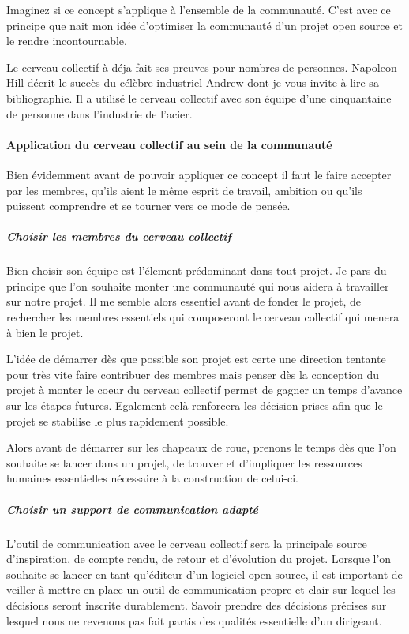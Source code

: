 			Imaginez si ce concept s'applique à l'ensemble de la communauté. C'est avec ce principe que nait mon idée d'optimiser la communauté d'un projet open source et le rendre incontournable.

			Le cerveau collectif à déja fait ses preuves pour nombres de personnes. Napoleon Hill décrit le succès du célèbre industriel Andrew  dont je vous invite à lire sa bibliographie. Il a utilisé le cerveau collectif avec son équipe d'une cinquantaine de personne dans l'industrie de l'acier.

			\paragraph{Application du cerveau collectif au sein de la communauté}

			Bien évidemment avant de pouvoir appliquer ce concept il faut le faire accepter par les membres, qu'ils aient le même esprit de travail, ambition ou qu'ils puissent comprendre et se tourner vers ce mode de pensée.

				\subparagraph{Choisir les membres du cerveau collectif\\}

					Bien choisir son équipe est l'élement prédominant dans tout projet. Je pars du principe que l'on souhaite monter une communauté qui nous aidera à travailler sur notre projet. Il me semble alors essentiel avant de fonder le projet, de rechercher les membres essentiels qui composeront le cerveau collectif qui menera à bien le projet.

					L'idée de démarrer dès que possible son projet est certe une direction tentante pour très vite faire contribuer des membres mais penser dès la conception du projet à monter le coeur du cerveau collectif permet de gagner un temps d'avance sur les étapes futures. Egalement celà renforcera les décision prises afin que le projet se stabilise le plus rapidement possible.

					Alors avant de démarrer sur les chapeaux de roue, prenons le temps dès que l'on souhaite se lancer dans un projet, de trouver et d'impliquer les ressources humaines essentielles nécessaire à la construction de celui-ci. 

				\subparagraph{Choisir un support de communication adapté\\}

					L'outil de communication avec le cerveau collectif sera la principale source d'inspiration, de compte rendu, de retour et d'évolution du projet.
					Lorsque l'on souhaite se lancer en tant qu'éditeur d'un logiciel open source, il est important de veiller à mettre en place un outil de communication propre et clair sur lequel les décisions seront inscrite durablement.
					Savoir prendre des décisions précises sur lesquel nous ne revenons pas fait partis des qualités essentielle d'un dirigeant.

